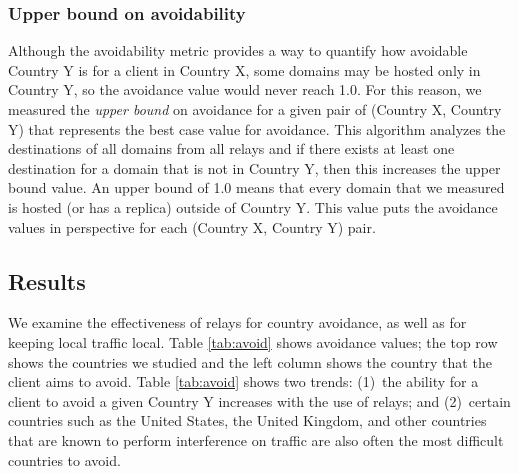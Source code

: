 \subsubsection{Upper bound on avoidability}  Although the avoidability metric
provides a way to quantify how avoidable Country Y is for a client in Country
X, some domains may be hosted only in Country Y, so the avoidance value  would
never reach 1.0.  For this reason, we measured the {\em upper bound} on
avoidance for a given pair of (Country X, Country Y) that represents the best
case value for avoidance.  This algorithm analyzes the destinations of all
domains from all relays and if there exists at least one destination for a
domain that is not in Country Y, then this increases the upper bound value. An
upper bound of 1.0 means that every domain that we measured is hosted (or has
a replica) outside of Country Y.  This value puts the avoidance values in
perspective for each (Country X, Country Y) pair.

\subsection{Results}

We examine the
effectiveness of relays for country avoidance, as well as for keeping local
traffic local.  Table \ref{tab:avoid} shows avoidance values; the top
row shows the countries we studied and the left column shows the country
that the client aims to avoid.
%
Table \ref{tab:avoid} shows two trends: (1)~the ability
for a client to avoid a given Country Y increases with the use of relays; and (2)~certain
countries such as the United States, the United Kingdom, and other countries that
are known to perform interference on traffic are also often the most difficult countries
to avoid.

